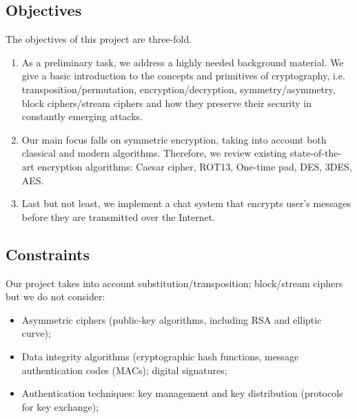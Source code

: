 \subsection{Objectives}
The objectives of this project are three-fold. 
\begin{enumerate}
\item  As a preliminary task, we address a highly needed background material. We give a basic introduction to the concepts and primitives of cryptography, i.e. transposition/permutation, encryption/decryption, symmetry/asymmetry, block ciphers/stream ciphers and how they preserve their security in constantly emerging attacks.
\item  Our main focus falls on symmetric encryption, taking into account both classical and modern algorithms. Therefore,  we review existing state-of-the-art encryption algorithms: Caesar cipher, ROT13, One-time pad, DES, 3DES, AES.
\item Last but not least, we implement a chat system that encrypts user's messages before they are transmitted over the Internet.
\end{enumerate}


\subsection{Constraints}
Our project takes into account substitution/transposition; block/stream ciphers but we do not consider:
\begin{itemize}
\item Asymmetric ciphers (public-key algorithms, including RSA and elliptic curve); 
\end{itemize}
\begin{itemize}
\item Data integrity algorithms (cryptographic hash functions, message authentication codes (MACs); digital signatures; 
\end{itemize}
\begin{itemize}
\item Authentication techniques: key management and key distribution (protocols for key exchange);
\end{itemize}


